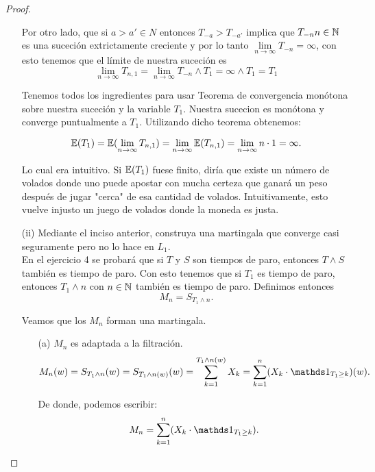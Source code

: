 \begin{proof}
\begin{enumerate}
			Por otro lado, que si $a>a' \in N$ entonces $T_{-a} > T_{-a'}$ implica que $T_{-n} n \in \mathbb{N}$ es 
			una suceción extrictamente creciente y por lo tanto 
			$\lim\limits_{n \rightarrow \infty} T_{-n} = \infty$, con esto tenemos que el límite de nuestra 
			suceción es 
			$$		
			\lim_{n\rightarrow\infty} T_{n,1} = 
			\lim_{n\rightarrow\infty} T_{-n} \wedge T_1 = 
			\infty \wedge T_1 = 
			T_1
			$$

			Tenemos todos los ingredientes para usar Teorema de convergencia monótona sobre nuestra suceción
			y la variable $T_1$. Nuestra sucecion es monótona y converge puntualmente a $T_1$. Utilizando
			dicho teorema obtenemos:
			
			$$
			\mathbb{E}(T_1) = 
			\mathbb{E}(\lim_{n\rightarrow\infty} T_{n,1}) = 
			\lim_{n\rightarrow\infty} \mathbb{E}(T_{n,1}) = 
			\lim_{n\rightarrow\infty} n\cdot 1 =
			\infty.
			$$
			
			Lo cual era intuitivo. Si $\mathbb{E}(T_1)$ fuese finito, diría que existe un número de volados donde
			uno puede apostar con mucha certeza que ganará un peso después de jugar "cerca" de esa cantidad
			de volados. Intuitivamente, esto vuelve injusto un juego de volados donde la moneda es
			justa.\\
			
		\item[(ii)]
		Mediante el inciso anterior, construya una martingala que converge 
		casi seguramente pero no lo hace en $L_1$.\\

			
			En el ejercicio 4 se probará que si $T$ y $S$ son tiempos de paro, entonces $T\wedge S$ también 
			es tiempo de paro. Con esto tenemos que si $T_1$ es tiempo de paro, entonces $T_1 \wedge n$ con 
			$n \in \mathbb{N}$ también es tiempo de paro. Definimos entonces 
			$$M_n = S_{T_1 \wedge n}.$$
			
			Veamos que los $M_n$ forman una martingala.
			
			\begin{itemize}
			 	\item[(a)] 
				 	$M_n$ es adaptada a la filtración.
			 		$$
			 		M_n(w) = S_{T_1 \wedge n}(w) = 
			 		S_{T_1 \wedge n (w)}(w) = 
			 		\sum_{k=1}^{T_1 \wedge n (w)} X_k = 
			 		\sum_{k=1}^{n} (X_k \cdot \indic_{T_1 \geq k})(w).
			 		$$
			 		
			 		De donde, podemos escribir:
					\begin{equation}\label{problema1_3:descomposicion_de_M_n}
			 			M_n = \sum_{k=1}^{n} (X_k \cdot \indic_{T_1 \geq k}).
					\end{equation}								 		
			 		

\end{itemize}
\end{enumerate}
\end{proof}
